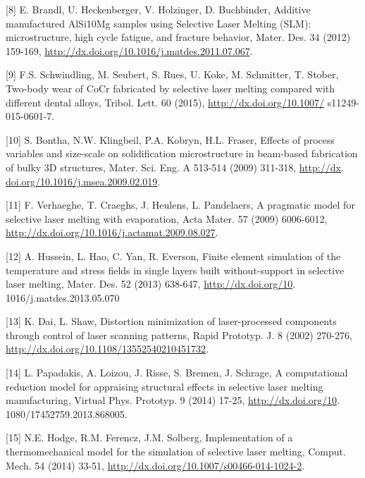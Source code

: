 \documentclass[10pt]{article}
\begin{document}
[8] E. Brandl, U. Heckenberger, V. Holzinger, D. Buchbinder, Additive manufactured AlSi10Mg samples using Selective Laser Melting (SLM): microstructure, high cycle fatigue, and fracture behavior, Mater. Des. 34 (2012) 159-169, \href{http://dx.doi.org/10.1016/j.matdes.2011.07.067}{http://dx.doi.org/10.1016/j.matdes.2011.07.067}.

[9] F.S. Schwindling, M. Seubert, S. Rues, U. Koke, M. Schmitter, T. Stober, Two-body wear of $\mathrm{CoCr}$ fabricated by selective laser melting compared with different dental alloys, Tribol. Lett. 60 (2015), \href{http://dx.doi.org/10.1007/}{http://dx.doi.org/10.1007/} s11249-015-0601-7.

[10] S. Bontha, N.W. Klingbeil, P.A. Kobryn, H.L. Fraser, Effects of process variables and size-scale on solidification microstructure in beam-based fabrication of bulky 3D structures, Mater. Sci. Eng. A 513-514 (2009) 311-318, \href{http://dx}{http://dx}. \href{http://doi.org/10.1016/j.msea.2009.02.019}{doi.org/10.1016/j.msea.2009.02.019}.

[11] F. Verhaeghe, T. Craeghs, J. Heulens, L. Pandelaers, A pragmatic model for selective laser melting with evaporation, Acta Mater. 57 (2009) 6006-6012, \href{http://dx.doi.org/10.1016/j.actamat.2009.08.027}{http://dx.doi.org/10.1016/j.actamat.2009.08.027}.

[12] A. Hussein, L. Hao, C. Yan, R. Everson, Finite element simulation of the temperature and stress fields in single layers built without-support in selective laser melting, Mater. Des. 52 (2013) 638-647, \href{http://dx.doi.org/10}{http://dx.doi.org/10}. 1016/j.matdes.2013.05.070

[13] K. Dai, L. Shaw, Distortion minimization of laser-processed components through control of laser scanning patterns, Rapid Prototyp. J. 8 (2002) 270-276, \href{http://dx.doi.org/10.1108/13552540210451732}{http://dx.doi.org/10.1108/13552540210451732}.

[14] L. Papadakis, A. Loizou, J. Risse, S. Bremen, J. Schrage, A computational reduction model for appraising structural effects in selective laser melting manufacturing, Virtual Phys. Prototyp. 9 (2014) 17-25, \href{http://dx.doi.org/10}{http://dx.doi.org/10}. 1080/17452759.2013.868005.

[15] N.E. Hodge, R.M. Ferencz, J.M. Solberg, Implementation of a thermomechanical model for the simulation of selective laser melting, Comput. Mech. 54 (2014) 33-51, \href{http://dx.doi.org/10.1007/s00466-014-1024-2}{http://dx.doi.org/10.1007/s00466-014-1024-2}.
\end{document}
